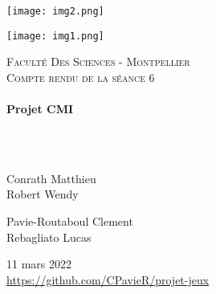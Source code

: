 \documentclass[a4paper, 12pt]{article}
\begin{document}
\begin{titlepage}
  \begin{sffamily}
  \begin{center}
  

\begin{minipage}[c]{.46\linewidth}
     \begin{center}
             \texttt{[image: img2.png]}
         \end{center}
   \end{minipage} \hfill
   \begin{minipage}[c]{.46\linewidth}
    \begin{center}
            \texttt{[image: img1.png]}
        \end{center}
 \end{minipage}
    \newline \newline

    \textsc{\LARGE Faculté Des Sciences - Montpellier}\\[2cm]

    \textsc{\Large Compte rendu de la séance 6}\\[1.5cm]

    \HRule \\[0.4cm]
    { \huge \bfseries Projet CMI\\[0.4cm] }

    \HRule \\[2cm]
    \\[2cm]

    \begin{minipage}{0.4\textwidth}
      \begin{flushleft} \large
        Conrath Matthieu\\
        Robert Wendy\\
      \end{flushleft}
    \end{minipage}
    \begin{minipage}{0.4\textwidth}
      \begin{flushright} \large
       Pavie-Routaboul Clement\\
        Rebagliato Lucas\\
      \end{flushright}
    \end{minipage}

    \vfill
    {\large 11 mars 2022}
    \\
    {\url{https://github.com/CPavieR/projet-jeux}}

  \end{center}
  \end{sffamily}
\end{titlepage}
\end{document}
